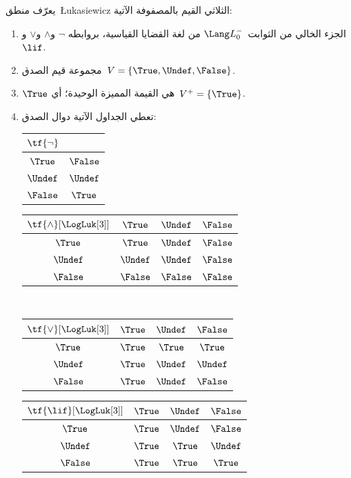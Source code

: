 \documentclass[../../../include/open-logic-section]{subfiles}
\begin{document}
\begin{defn}
يعرّف منطق~\L ukasiewicz الثلاثي القيم بالمصفوفة الآتية:
\begin{enumerate}
  \item الجزء الخالي من الثوابت~$\Lang L_0^{-}$ من لغة القضايا القياسية، بروابطه
  $\lnot$ و$\land$ و$\lor$ و$\lif$.
  \item مجموعة قيم الصدق~$V = \{\True, \Undef, \False\}$.
  \item $\True$ هي القيمة المميزة الوحيدة؛ أي~$V^+ = \{\True\}$.
  \item تعطي الجداول الآتية دوال الصدق:
  \begin{center}
    \begin{tabular}{c|c}
      $\tf{\lnot}$ & \\
      \hline
      $\True$ & $\False$ \\
      $\Undef$ & $\Undef$ \\
      $\False$ & $\True$
    \end{tabular}
    \quad
    \begin{tabular}{c|ccc}
      $\tf{\land}[\LogLuk[3]]$ & $\True$ & $\Undef$ & $\False$ \\
      \hline
      $\True$ & $\True$ & $\Undef$ & $\False$ \\
      $\Undef$ & $\Undef$ & $\Undef$ & $\False$\\
      $\False$ & $\False$ & $\False$ & $\False$
    \end{tabular}
    \\[2ex]
    \begin{tabular}{c|ccc}
      $\tf{\lor}[\LogLuk[3]]$ & $\True$ & $\Undef$ & $\False$ \\
      \hline
      $\True$ & $\True$ & $\True$ & $\True$ \\
      $\Undef$ & $\True$ & $\Undef$ & $\Undef$ \\
      $\False$ & $\True$ & $\Undef$ & $\False$
    \end{tabular}
    \quad
    \begin{tabular}{c|ccc}
      $\tf{\lif}[\LogLuk[3]]$ & $\True$ & $\Undef$ & $\False$ \\
      \hline
      $\True$ & $\True$ & $\Undef$ & $\False$ \\
      $\Undef$ & $\True$ & $\True$ & $\Undef$  \\
      $\False$ & $\True$ & $\True$ & $\True$
    \end{tabular}
  \end{center}
\end{enumerate}
\end{defn}
\end{document}
